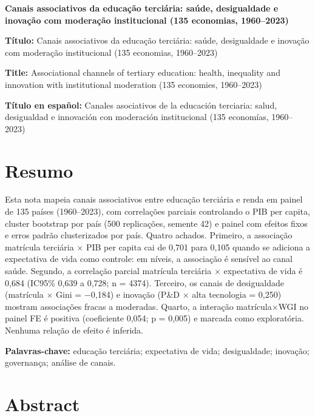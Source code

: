 \documentclass[12pt,a4paper]{article}
\begin{document}
\begin{center}
{\Large\bfseries Canais associativos da educação terciária: saúde, desigualdade e inovação com moderação institucional (135 economias, 1960--2023)}
\end{center}

\noindent\textbf{Título:} Canais associativos da educação terciária: saúde, desigualdade e inovação com moderação institucional (135 economias, 1960--2023)

\noindent\textbf{Title:} Associational channels of tertiary education: health, inequality and innovation with institutional moderation (135 economies, 1960--2023)

\noindent\textbf{Título en español:} Canales asociativos de la educación terciaria: salud, desigualdad e innovación con moderación institucional (135 economías, 1960--2023)

\vspace{0.8cm}

\section*{Resumo}

Esta nota mapeia canais associativos entre educação terciária e renda em painel de 135 países (1960--2023), com correlações parciais controlando o PIB per capita, cluster bootstrap por país (500 replicações, semente 42) e painel com efeitos fixos e erros padrão clusterizados por país. Quatro achados. Primeiro, a associação matrícula terciária $\times$ PIB per capita cai de 0,701 para 0,105 quando se adiciona a expectativa de vida como controle: em níveis, a associação é sensível ao canal saúde. Segundo, a correlação parcial matrícula terciária $\times$ expectativa de vida é 0,684 (IC95\% 0,639 a 0,728; n = 4374). Terceiro, os canais de desigualdade (matrícula $\times$ Gini = $-$0,184) e inovação (P\&D $\times$ alta tecnologia = 0,250) mostram associações fracas a moderadas. Quarto, a interação matrícula$\times$WGI no painel FE é positiva (coeficiente 0,054; p = 0,005) e marcada como exploratória. Nenhuma relação de efeito é inferida.

\noindent\textbf{Palavras-chave:} educação terciária; expectativa de vida; desigualdade; inovação; governança; análise de canais.

\section*{Abstract}
\end{document}

